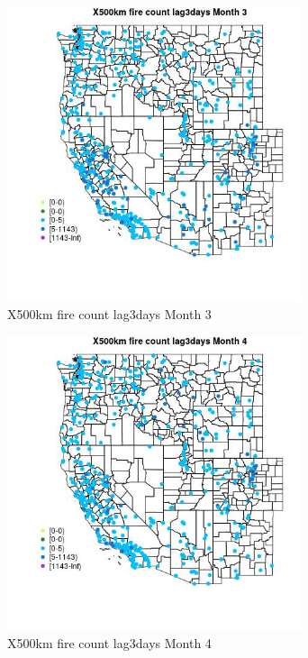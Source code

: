 \begin{figure} 
\centering  
\includegraphics[width=0.77\textwidth]{Code_Outputs/Report_ML_input_PM25_Step4_part_e_de_duplicated_aves_compiled_2019-05-14wNAs_MapObsMo3X500km_fire_count_lag3days.jpg} 
\caption{\label{fig:Report_ML_input_PM25_Step4_part_e_de_duplicated_aves_compiled_2019-05-14wNAsMapObsMo3X500km_fire_count_lag3days}X500km fire count lag3days Month 3} 
\end{figure} 
 

\begin{figure} 
\centering  
\includegraphics[width=0.77\textwidth]{Code_Outputs/Report_ML_input_PM25_Step4_part_e_de_duplicated_aves_compiled_2019-05-14wNAs_MapObsMo4X500km_fire_count_lag3days.jpg} 
\caption{\label{fig:Report_ML_input_PM25_Step4_part_e_de_duplicated_aves_compiled_2019-05-14wNAsMapObsMo4X500km_fire_count_lag3days}X500km fire count lag3days Month 4} 
\end{figure} 
 

